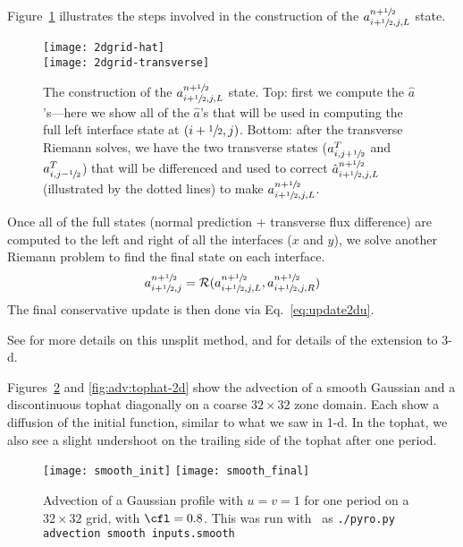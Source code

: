 Figure~\ref{fig:unsplitstates} illustrates the steps involved in
the construction of the $a_{i+{\sfrac{1}{2}},j,L}^{n+{\sfrac{1}{2}}}$ state.  
%
\begin{figure}
\centering
\texttt{[image: 2dgrid-hat]} \\
\texttt{[image: 2dgrid-transverse]}
\caption[The construction of an interface state with the transverse
  component]{\label{fig:unsplitstates} The construction of the
  $a_{i+{\sfrac{1}{2}},j,L}^{n+{\sfrac{1}{2}}}$ state.  Top: first we compute the
  $\hat{a}$'s---here we show all of the $\hat{a}$'s that will be used
  in computing the full left interface state at $(i+{\sfrac{1}{2}},j)$.  Bottom:
  after the transverse Riemann solves, we have the two transverse
  states ($a^T_{i,j+{\sfrac{1}{2}}}$ and $a^T_{i,j-{\sfrac{1}{2}}}$) that will be
  differenced and used to correct $\hat{a}_{i+{\sfrac{1}{2}},j,L}^{n+{\sfrac{1}{2}}}$
  (illustrated by the dotted lines) to make $a_{i+{\sfrac{1}{2}},j,L}^{n+{\sfrac{1}{2}}}$.}
\end{figure}

Once all of the full states (normal prediction $+$ transverse flux
difference) are computed to the left and right of all the interfaces
($x$ and $y$), we solve another Riemann problem to find the final
state on each interface.
\begin{equation}
a_{i+{\sfrac{1}{2}},j}^{n+{\sfrac{1}{2}}} = \mathcal{R}(a_{i+{\sfrac{1}{2}},j,L}^{n+{\sfrac{1}{2}}},
                                  a_{i+{\sfrac{1}{2}},j,R}^{n+{\sfrac{1}{2}}}) \\
\end{equation}
The final conservative update is then done via Eq.~\ref{eq:update2du}.

See \cite{colella:1990} for more details on this unsplit method,
and \cite{saltzman:1994} for details of the extension to 3-d.

Figures~\ref{fig:adv:gaussian-2d} and \ref{fig:adv:tophat-2d} show the
advection of a smooth Gaussian and a discontinuous tophat diagonally on
a coarse $32\times 32$ zone domain.  Each show a diffusion of the
initial function, similar to what we saw in 1-d.  In the tophat, we
also see a slight undershoot on the trailing side of the tophat after
one period.




\begin{figure}
\centering
\texttt{[image: smooth\_init]}\hspace{1em}
\texttt{[image: smooth\_final]}
\caption[Advection of Gaussian profile in 2-d]
  {\label{fig:adv:gaussian-2d} Advection of a Gaussian profile
  with $u = v = 1$ for one period on a $32\times 32$ grid, with $\cfl =
  0.8$.  This was run with \pyro\ as {\tt ./pyro.py advection smooth
    inputs.smooth}}
\end{figure}


